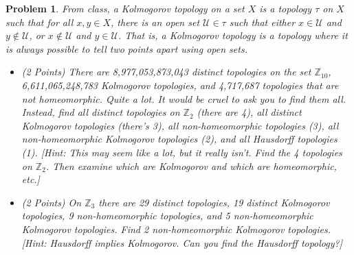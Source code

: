 \documentclass{article}
\theoremstyle{normal}
\newtheorem{problem}{Problem}
\begin{document}
    \begin{problem}
        From class, a Kolmogorov topology on a set $X$ is a topology
        $\tau$ on $X$ such that for all $x,y\in{X}$, there is an open set
        $\mathcal{U}\in\tau$ such that either $x\in\mathcal{U}$ and
        $y\notin\mathcal{U}$, or $x\notin\mathcal{U}$ and $y\in\mathcal{U}$.
        That is, a Kolmogorov topology is a topology where it is always possible
        to tell two points apart using open sets.
        \begin{itemize}
            \item (2 Points)
                There are 8,977,053,873,043 distinct topologies on the set
                $\mathbb{Z}_{10}$, 6,611,065,248,783 Kolmogorov topologies,
                and 4,717,687 topologies that are not homeomorphic. Quite a lot.
                It would be cruel to ask you to find them all. Instead, find all
                distinct topologies on $\mathbb{Z}_{2}$ (there are 4), all
                distinct Kolmogorov topologies (there's 3), all non-homeomorphic
                topologies (3), all non-homeomorphic Kolmogorov topologies
                (2), and all Hausdorff topologies (1). [Hint: This may seem
                like a lot, but it really isn't. Find the 4 topologies on
                $\mathbb{Z}_{2}$. Then examine which are Kolmogorov and which
                are homeomorphic, etc.]
            \item (2 Points)
                On $\mathbb{Z}_{3}$ there are 29 distinct topologies, 19
                distinct Kolmogorov topologies, 9 non-homeomorphic topologies,
                and 5 non-homeomorphic Kolmogorov topologies. Find 2
                non-homeomorphic Kolmogorov topologies.
                [Hint: Hausdorff implies Kolmogorov. Can you find the
                Hausdorff topology?]
        \end{itemize}
    \end{problem}
    \color{black}
\end{document}
